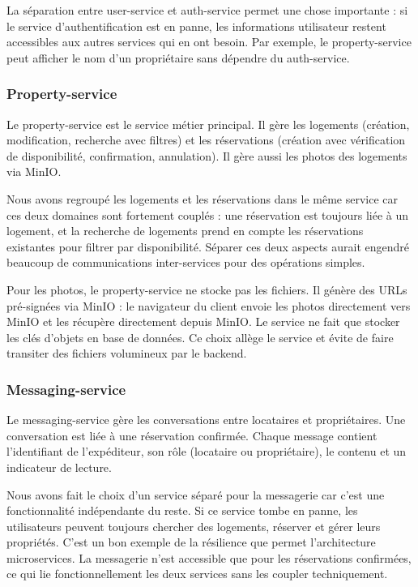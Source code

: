 \documentclass[12pt, a4paper]{article}
\begin{document}
La séparation entre user-service et auth-service permet une chose importante : si le service d'authentification est en panne, les informations utilisateur restent accessibles aux autres services qui en ont besoin. Par exemple, le property-service peut afficher le nom d'un propriétaire sans dépendre du auth-service.

\subsubsection{Property-service}

Le property-service est le service métier principal. Il gère les logements (création, modification, recherche avec filtres) et les réservations (création avec vérification de disponibilité, confirmation, annulation). Il gère aussi les photos des logements via MinIO.

Nous avons regroupé les logements et les réservations dans le même service car ces deux domaines sont fortement couplés : une réservation est toujours liée à un logement, et la recherche de logements prend en compte les réservations existantes pour filtrer par disponibilité. Séparer ces deux aspects aurait engendré beaucoup de communications inter-services pour des opérations simples.

Pour les photos, le property-service ne stocke pas les fichiers. Il génère des URLs pré-signées via MinIO : le navigateur du client envoie les photos directement vers MinIO et les récupère directement depuis MinIO. Le service ne fait que stocker les clés d'objets en base de données. Ce choix allège le service et évite de faire transiter des fichiers volumineux par le backend.

\subsubsection{Messaging-service}

Le messaging-service gère les conversations entre locataires et propriétaires. Une conversation est liée à une réservation confirmée. Chaque message contient l'identifiant de l'expéditeur, son rôle (locataire ou propriétaire), le contenu et un indicateur de lecture.

Nous avons fait le choix d'un service séparé pour la messagerie car c'est une fonctionnalité indépendante du reste. Si ce service tombe en panne, les utilisateurs peuvent toujours chercher des logements, réserver et gérer leurs propriétés. C'est un bon exemple de la résilience que permet l'architecture microservices. La messagerie n'est accessible que pour les réservations confirmées, ce qui lie fonctionnellement les deux services sans les coupler techniquement.
\end{document}
